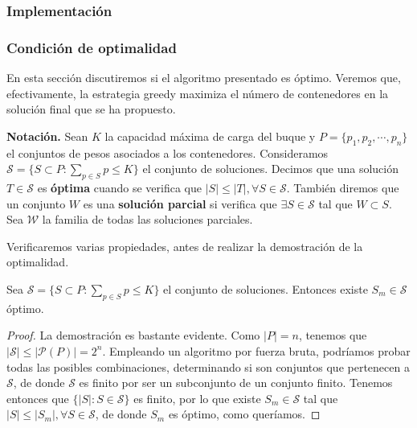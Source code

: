 \subsubsection{Implementación}



\subsubsection{Condición de optimalidad}
En esta sección discutiremos si el algoritmo presentado es óptimo. Veremos que,
efectivamente, la estrategia greedy maximiza el número de contenedores 
en la solución final que se ha propuesto. 

\textbf{Notación.} Sean $K$ la capacidad máxima de carga del buque y
$P = \{p_1,p_2,\cdots,p_n\}$ el conjuntos de pesos asociados
a los contenedores. Consideramos $\mathcal{S} = \{S \subset P : 
\sum_{p \in S} p \leq K\}$ el conjunto de soluciones. Decimos que una solución
$T \in \mathcal{S}$ es \textbf{óptima} cuando se verifica que $|S| \leq |T|,
\forall S \in \mathcal{S}$. 
También diremos que un conjunto $W$ es una \textbf{solución parcial}
si verifica que $\exists S \in \mathcal S$ tal que $W \subset S$. Sea $\mathcal{W}$ 
la familia de todas las soluciones parciales.

Verificaremos varias propiedades, antes de realizar la demostración de la optimalidad.

\begin{lemma}
    Sea $\mathcal{S} = \{S \subset P : \sum_{p \in S} p \leq K\}$ el conjunto de soluciones. Entonces
    existe $S_m \in \mathcal S$ óptimo. 
\end{lemma}

\begin{proof}
    La demostración es bastante evidente. Como $|P| = n$, tenemos que $|\mathcal S| \leq |\mathcal P (P)| = 2^n$. 
    Empleando un algoritmo por fuerza bruta, podríamos probar todas las posibles combinaciones, determinando si
    son conjuntos que pertenecen a $\mathcal S$, de donde $\mathcal S$ es finito por ser un subconjunto de un conjunto finito. 
    Tenemos entonces que $\{|S| : S \in \mathcal S\}$ es finito, por lo que existe $S_m \in \mathcal S$ tal que
    $|S| \leq |S_m|, \forall S \in \mathcal S$, de donde $S_m$ es óptimo, como queríamos. 
\end{proof}

